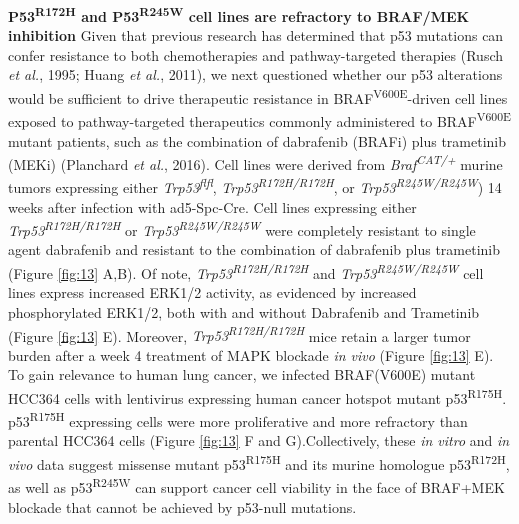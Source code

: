 \textbf{P53\textsuperscript{R172H} and P53\textsuperscript{R245W} cell lines are refractory to BRAF/MEK inhibition}
Given that previous research has determined that p53 mutations can confer resistance to both chemotherapies and pathway-targeted therapies (Rusch \emph{et al.}, 1995; Huang \emph{et al.}, 2011), we next questioned whether our p53 alterations would be sufficient to drive therapeutic resistance in BRAF\textsuperscript{V600E}-driven cell lines exposed to pathway-targeted therapeutics commonly administered to BRAF\textsuperscript{V600E} mutant patients, such as the combination of dabrafenib (BRAFi) plus trametinib (MEKi) (Planchard \emph{et al.}, 2016). Cell lines were derived from \emph{Braf\textsuperscript{CAT/+}} murine tumors expressing either \emph{Trp53\textsuperscript{flfl}}, \emph{Trp53\textsuperscript{R172H/R172H}}, or \emph{Trp53\textsuperscript{R245W/R245W}}) 14 weeks after infection with ad5-Spc-Cre. Cell lines expressing either \emph{Trp53\textsuperscript{R172H/R172H}} or \emph{Trp53\textsuperscript{R245W/R245W}} were completely resistant to single agent dabrafenib and resistant to the combination of dabrafenib plus trametinib (Figure \ref{fig:13} A,B). Of note, \emph{Trp53\textsuperscript{R172H/R172H}} and \emph{Trp53\textsuperscript{R245W/R245W}} cell lines express increased ERK1/2 activity, as evidenced by increased phosphorylated ERK1/2, both with and without Dabrafenib and Trametinib (Figure \ref{fig:13} E). Moreover, \emph{Trp53\textsuperscript{R172H/R172H}} mice retain a larger tumor burden after a week 4 treatment of MAPK blockade \emph{in vivo} (Figure \ref{fig:13} E). To gain relevance to human lung cancer, we infected BRAF(V600E) mutant HCC364 cells with lentivirus expressing human cancer hotspot mutant p53\textsuperscript{R175H}. p53\textsuperscript{R175H} expressing cells were more proliferative and more refractory than parental HCC364 cells (Figure \ref{fig:13} F and G).Collectively, these \emph{in vitro} and \emph{in vivo} data suggest missense mutant p53\textsuperscript{R175H} and its murine homologue p53\textsuperscript{R172H}, as well as p53\textsuperscript{R245W} can support cancer cell viability in the face of BRAF+MEK blockade that cannot be achieved by p53-null mutations.

